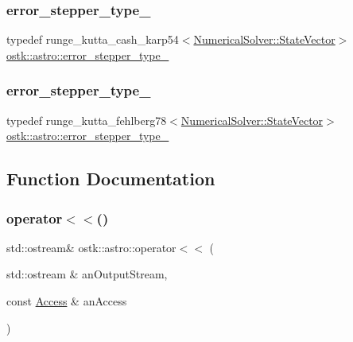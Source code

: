 \subsubsection{\texorpdfstring{error\+\_\+stepper\+\_\+type\+\_}{error\_stepper\_type\_54}}
{\footnotesize\ttfamily typedef runge\+\_\+kutta\+\_\+cash\+\_\+karp54$<$\hyperlink{classostk_1_1astro_1_1_numerical_solver_a4a1673a6f74a72d6bacfe6480b9c1ccd}{Numerical\+Solver\+::\+State\+Vector}$>$ \hyperlink{namespaceostk_1_1astro_ae0e87d949c5bf8265860957bc3e551a4}{ostk\+::astro\+::error\+\_\+stepper\+\_\+type\+\_}}

\mbox{\label{namespaceostk_1_1astro_ac65cff551d02047f499131307bd5f688}} 
\subsubsection{\texorpdfstring{error\+\_\+stepper\+\_\+type\+\_}{error\_stepper\_type\_78}}
{\footnotesize\ttfamily typedef runge\+\_\+kutta\+\_\+fehlberg78$<$\hyperlink{classostk_1_1astro_1_1_numerical_solver_a4a1673a6f74a72d6bacfe6480b9c1ccd}{Numerical\+Solver\+::\+State\+Vector}$>$ \hyperlink{namespaceostk_1_1astro_ac65cff551d02047f499131307bd5f688}{ostk\+::astro\+::error\+\_\+stepper\+\_\+type\+\_}}



\subsection{Function Documentation}
\mbox{\label{namespaceostk_1_1astro_ad6bf403749e98996e2e56cd6dc8cc848}} 
\subsubsection{\texorpdfstring{operator$<$$<$()}{operator<<()}\hspace{0.1cm}{\footnotesize\ttfamily [1/3]}}
{\footnotesize\ttfamily std\+::ostream\& ostk\+::astro\+::operator$<$$<$ (\begin{DoxyParamCaption}\item[{std\+::ostream \&}]{an\+Output\+Stream,  }\item[{const \hyperlink{classostk_1_1astro_1_1_access}{Access} \&}]{an\+Access }\end{DoxyParamCaption})}


